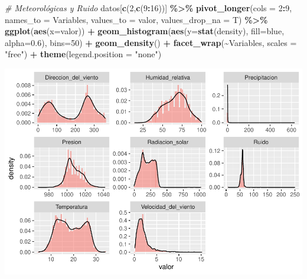 \documentclass[notspecified,article,submit,moreauthors,pdftex]{Definitions/mdpi}
\newenvironment{Shaded}{\begin{snugshade}}{\end{snugshade}}
\newcommand{\AttributeTok}[1]{\textcolor[rgb]{0.13,0.29,0.53}{#1}}
\newcommand{\CommentTok}[1]{\textcolor[rgb]{0.56,0.35,0.01}{\textit{#1}}}
\newcommand{\DecValTok}[1]{\textcolor[rgb]{0.00,0.00,0.81}{#1}}
\newcommand{\FloatTok}[1]{\textcolor[rgb]{0.00,0.00,0.81}{#1}}
\newcommand{\FunctionTok}[1]{\textcolor[rgb]{0.13,0.29,0.53}{\textbf{#1}}}
\newcommand{\NormalTok}[1]{#1}
\newcommand{\SpecialCharTok}[1]{\textcolor[rgb]{0.81,0.36,0.00}{\textbf{#1}}}
\newcommand{\StringTok}[1]{\textcolor[rgb]{0.31,0.60,0.02}{#1}}
\begin{document}
\begin{Shaded}
\begin{Highlighting}[]
\CommentTok{\# Meteorológicas y Ruido}
\NormalTok{datos[}\FunctionTok{c}\NormalTok{(}\DecValTok{2}\NormalTok{,}\FunctionTok{c}\NormalTok{(}\DecValTok{9}\SpecialCharTok{:}\DecValTok{16}\NormalTok{))] }\SpecialCharTok{\%\textgreater{}\%}
  \FunctionTok{pivot\_longer}\NormalTok{(}\AttributeTok{cols =} \DecValTok{2}\SpecialCharTok{:}\DecValTok{9}\NormalTok{, }\AttributeTok{names\_to =} \StringTok{\textquotesingle{}Variables\textquotesingle{}}\NormalTok{, }\AttributeTok{values\_to =} \StringTok{\textquotesingle{}valor\textquotesingle{}}\NormalTok{, }\AttributeTok{values\_drop\_na =}\NormalTok{ T) }\SpecialCharTok{\%\textgreater{}\%}
  \FunctionTok{ggplot}\NormalTok{(}\FunctionTok{aes}\NormalTok{(}\AttributeTok{x=}\NormalTok{valor)) }\SpecialCharTok{+} 
  \FunctionTok{geom\_histogram}\NormalTok{(}\FunctionTok{aes}\NormalTok{(}\AttributeTok{y=}\FunctionTok{stat}\NormalTok{(density), }\AttributeTok{fill=}\StringTok{\textquotesingle{}blue\textquotesingle{}}\NormalTok{, }\AttributeTok{alpha=}\FloatTok{0.6}\NormalTok{), }\AttributeTok{bins=}\DecValTok{50}\NormalTok{) }\SpecialCharTok{+}
  \FunctionTok{geom\_density}\NormalTok{() }\SpecialCharTok{+}
  \FunctionTok{facet\_wrap}\NormalTok{(}\SpecialCharTok{\textasciitilde{}}\NormalTok{Variables, }\AttributeTok{scales =} \StringTok{"free"}\NormalTok{) }\SpecialCharTok{+} 
  \FunctionTok{theme}\NormalTok{(}\AttributeTok{legend.position =} \StringTok{"none"}\NormalTok{)}
\end{Highlighting}
\end{Shaded}

\includegraphics{ProyectoAED2023_plantilla_files/figure-latex/unnamed-chunk-15-1.pdf}
\end{document}

